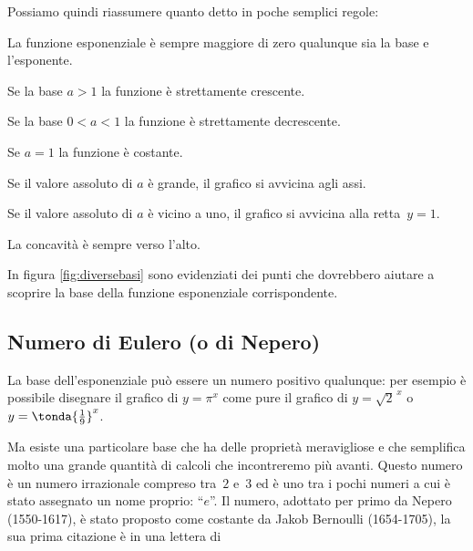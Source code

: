 \newpage %

Possiamo quindi riassumere quanto detto in poche semplici regole: 
\begin{enumerate*}
 \item La funzione esponenziale è sempre maggiore di zero qualunque sia la 
base e l'esponente.
 \item Se la base \(a>1\) la funzione è strettamente crescente.
 \item Se la base \(0<a<1\) la funzione è strettamente decrescente.
 \item Se \(a=1\) la funzione è costante.
 \item Se il valore assoluto di \(a\) è grande, il grafico si avvicina agli 
assi.
 \item Se il valore assoluto di \(a\) è vicino a uno, il grafico si 
avvicina alla 
retta~\(y=1\).
 \item La concavità è sempre verso l'alto.
\end{enumerate*}

In figura \ref{fig:diversebasi} sono evidenziati dei punti che dovrebbero 
aiutare a scoprire la base della funzione esponenziale corrispondente.

\subsection{Numero di Eulero (o di Nepero)}
\label{subsec:esplog_eulero}

\begin{minipage}{.48\textwidth}
La base dell'esponenziale può essere un numero positivo qualunque: per 
esempio è possibile disegnare il grafico di \(y=\pi^x\)
come pure il grafico di \(y = \sqrt{2}^{\,x}\) o 
\(y = \tonda{\frac{1}{9}}^{x}\). 

Ma esiste una particolare base che ha delle proprietà meravigliose e che 
semplifica molto una grande quantità di calcoli che incontreremo più avanti.
Questo numero è un numero irrazionale compreso tra~\(2\) e~\(3\) ed è uno 
tra i pochi numeri a cui è stato assegnato un nome proprio: ``\(e\)''.
Il numero, adottato per primo da Nepero (1550-1617), è stato proposto come 
costante da Jakob Bernoulli (1654-1705), la sua prima citazione è in una 
lettera di
\end{minipage}
\hfill
\begin{minipage}{.48\textwidth}
\begin{center} \altrebasi \end{center}
\end{minipage}

